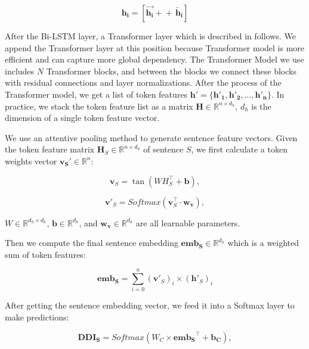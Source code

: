 \documentclass[conference]{IEEEtran}
\begin{document}
\begin{equation}
\bm{h_i} = \left [ \overrightarrow{\bm{h_i}} +\!\!\!\!+\,  \overleftarrow{\bm{h_i}} \right ]
\end{equation}

After the Bi-LSTM layer, a Transformer layer which is described in \cite{vaswani_attention_2017} follows.
We append the Transformer layer at this position because Transformer model is more efficient and can capture more global dependency.
The Transformer Model we use includes $N$ Transformer blocks, and between the blocks we connect these blocks with residual connections and layer normalizations.
After the process of the Transformer model, we get a list of token features $\bm{h'} = \{ \bm{h'_1}, \bm{h'_2}, \dots, \bm{h'_n} \}$.
In practice, we stack the token feature list as a matrix $\bm{\text{H}} \in \mathbb{R}^{n \times d_h}$, $d_h$ is the dimension of a single token feature vector.

We use an attentive pooling method to generate sentence feature vectors.
Given the token feature matrix $\bm{H}_S \in \mathbb{R}^{n \times d_h}$ of sentence $S$, we first calculate a token weights vector $\bm{v_S'} \in \mathbb{R}^{n}$:

\begin{equation}
\bm{v}_S = \tan \left ( W H_S^{\top} + \bm{b} \right ),
\end{equation}

\begin{equation}
\bm{v'}_S = Softmax \left (  \bm{v}_S^{\top} \cdot \bm{w_v} \right ),
\end{equation}

\noindent
$W \in \mathbb{R}^{d_h \times d_h}$, $\bm{b} \in \mathbb{R}^{d_h}$, and $\bm{w_v} \in \mathbb{R}^{d_h}$ are all learnable parameters.

Then we compute the final sentence embedding $\bm{emb_{\text{S}}} \in \mathbb{R}^{d_h}$ which is a weighted sum of token features:

\begin{equation}
\bm{emb_{\text{S}}} = \sum_{i=0}^{n} {(\bm{v'}_S)_i \times (\bm{h'}_S)_i}
\end{equation}

After getting the sentence embedding vector, we feed it into a Softmax layer to make predictions:

\begin{equation}
\bm{DDI_S} = Softmax \left ( W_C \times \bm{emb_{\text{S}}}^{\top} + \bm{b_C} \right ),
\end{equation}
\end{document}
